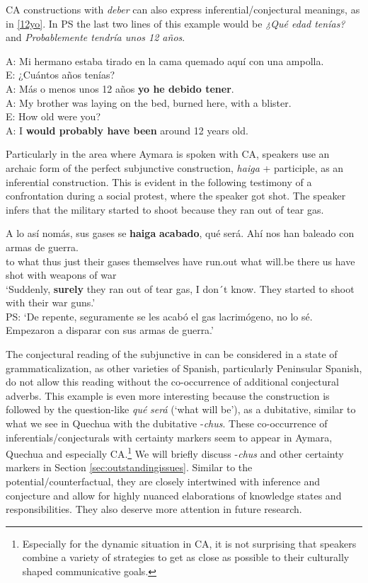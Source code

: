 \documentclass[output=paper,hidelinks]{langscibook}
\begin{document}
CA constructions with \textit{deber} can also express inferential/conjectural meanings, as in \ref{12yo}. In PS the last two lines of this example would be \textit{¿Qué edad tenías?} and \textit{Probablemente tendría unos 12 años}.

\ea \label{12yo}
A: Mi hermano estaba tirado en la cama quemado aquí con una ampolla.\\
E: ¿Cuántos años tenías?\\
A: Más o menos unos 12 años \textbf{yo he debido tener}. \\
\medskip
A: My brother was laying on the bed, burned here, with a blister.\\
E: How old were you?\\
A: I \textbf{would probably have been} around 12 years old.\\ 
\citep[195]{dankelpagel2012}
\z



Particularly in the area where Aymara is spoken with CA, speakers use an archaic form of the perfect subjunctive construction, \textit{haiga} + participle, as an inferential construction. This is evident in the following testimony of a confrontation during a social protest, where the speaker got shot. The speaker infers that the military started to shoot because they ran out of tear gas. 

\ea \label{ex:haiga}
\gll A lo así nomás, sus gases se \textbf{haiga} \textbf{acabado}, qué será. Ahí nos han baleado con armas de guerra. \\
to what thus just their gases themselves have run.out what will.be there us have shot with weapons of war \\ \glt ‘Suddenly, \textbf{surely} they ran out of tear gas, I don´t know. They started to shoot with their war guns.’\\
PS: `De repente, seguramente se les acabó el gas lacrimógeno, no lo sé. Empezaron a disparar con sus armas de guerra.'\\
\z

The conjectural reading of the subjunctive in  can be considered in a state of grammaticalization, as other varieties of Spanish, particularly Peninsular Spanish, do not allow this reading without the co-occurrence of additional conjectural adverbs. This example is even more interesting because the construction is followed by the question-like \textit{qué} \textit{será} (`what will be'), as a dubitative, similar to what we see in Quechua with the dubitative -\textit{chus}. These co-occurrence of
inferentials/conjecturals with certainty markers seem to appear in Aymara, Quechua and especially CA.\footnote{Especially for the dynamic situation in CA, it is not surprising that speakers combine a variety of strategies to get as close as possible to their culturally shaped communicative goals.} We will briefly discuss -\textit{chus} and other certainty markers in Section \ref{sec:outstandingissues}.
Similar to the potential/counterfactual, they are closely intertwined with inference and conjecture and allow for highly nuanced elaborations of knowledge states and
responsibilities. They also deserve more attention in future research.
\end{document}
